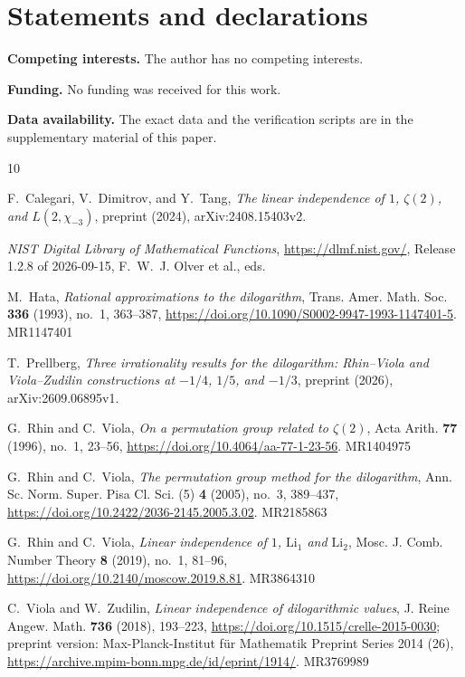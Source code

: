 \documentclass{amsart}
\numberwithin{equation}{section}
\numberwithin{table}{section}
\begin{document}
\section*{Statements and declarations}
\textbf{Competing interests.} The author has no competing interests.

\textbf{Funding.} No funding was received for this work.

\textbf{Data availability.} The exact data and the verification scripts are
in the supplementary material of this paper.

\begin{thebibliography}{10}

F.~Calegari, V.~Dimitrov, and Y.~Tang, \emph{The linear independence of $1$,
$\zeta(2)$, and $L(2,\chi_{-3})$}, preprint (2024), arXiv:2408.15403v2.

\emph{NIST Digital Library of Mathematical Functions},
\url{https://dlmf.nist.gov/}, Release 1.2.8 of 2026-09-15, F.~W.~J. Olver
et al., eds.

M.~Hata, \emph{Rational approximations to the dilogarithm}, Trans. Amer. Math.
Soc. \textbf{336} (1993), no.~1, 363--387,
\url{https://doi.org/10.1090/S0002-9947-1993-1147401-5}. MR1147401

T.~Prellberg, \emph{Three irrationality results for the dilogarithm:
Rhin--Viola and Viola--Zudilin constructions at $-1/4$, $1/5$, and $-1/3$},
preprint (2026), arXiv:2609.06895v1.

G.~Rhin and C.~Viola, \emph{On a permutation group related to $\zeta(2)$},
Acta Arith. \textbf{77} (1996), no.~1, 23--56,
\url{https://doi.org/10.4064/aa-77-1-23-56}. MR1404975

G.~Rhin and C.~Viola, \emph{The permutation group method for the dilogarithm},
Ann. Sc. Norm. Super. Pisa Cl. Sci. (5) \textbf{4} (2005), no.~3, 389--437,
\url{https://doi.org/10.2422/2036-2145.2005.3.02}. MR2185863

G.~Rhin and C.~Viola, \emph{Linear independence of $1$, $\mathrm{Li}_1$ and
$\mathrm{Li}_2$}, Mosc. J. Comb. Number Theory \textbf{8} (2019), no.~1,
81--96,
\url{https://doi.org/10.2140/moscow.2019.8.81}. MR3864310

C.~Viola and W.~Zudilin, \emph{Linear independence of dilogarithmic values},
J. Reine Angew. Math. \textbf{736} (2018), 193--223,
\url{https://doi.org/10.1515/crelle-2015-0030}; preprint version:
Max-Planck-Institut f\"ur Mathematik Preprint Series 2014 (26),
\url{https://archive.mpim-bonn.mpg.de/id/eprint/1914/}. MR3769989

\end{thebibliography}
\end{document}
